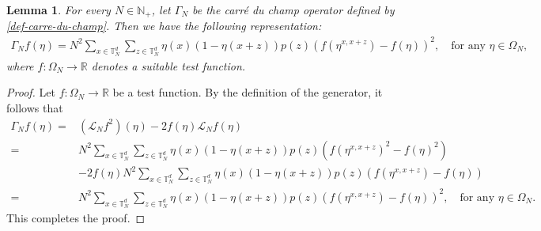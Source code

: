 \documentclass[UTF-8,reqno]{amsart}
\numberwithin{equation}{section}
\newtheorem{lemma}[theorem]{Lemma}
\begin{document}
\begin{lemma}
For every $N\in\mathbb{N}_+$, let $\Gamma_N$ be the carr\'e du champ operator defined by \eqref{def-carre-du-champ}. Then we have the following representation: 
\begin{align}\label{carre-property}
\Gamma_N f(\eta)=N^2 \sum_{x \in \mathbb{T}^d_N} \sum_{z \in \mathbb{T}^d_N} \eta(x)(1 - \eta(x+z)) p(z)(f(\eta^{x,x+z})-f(\eta))^2, \quad \text{for any } \eta \in \Omega_N,
\end{align}
where $f\colon \Omega_N \to \mathbb{R}$ denotes a suitable test function. 
\end{lemma}
\begin{proof}
Let $f:\Omega_N\rightarrow\mathbb{R}$ be a test function. By the definition of the generator, it follows that 
\begin{align*}
	\Gamma_N f(\eta) =& (\mathcal{L}_N f^2)(\eta) - 2 f(\eta) \mathcal{L}_N f(\eta)\\
	=&N^2 \sum_{x \in \mathbb{T}^d_N} \sum_{z \in \mathbb{T}^d_N} \eta(x)(1 - \eta(x+z)) p(z)(f(\eta^{x,x+z})^2-f(\eta)^2)\\
	&-2f(\eta)N^2 \sum_{x \in \mathbb{T}^d_N} \sum_{z \in \mathbb{T}^d_N} \eta(x)(1 - \eta(x+z)) p(z)(f(\eta^{x,x+z})-f(\eta))\\
	=&N^2 \sum_{x \in \mathbb{T}^d_N} \sum_{z \in \mathbb{T}^d_N} \eta(x)(1 - \eta(x+z)) p(z)(f(\eta^{x,x+z})-f(\eta))^2, \quad \text{for any } \eta \in \Omega_N. 
	\end{align*}
	This completes the proof. 
\end{proof}
\end{document}
